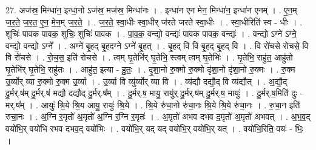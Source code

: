 \documentclass[17pt]{extarticle}
\begin{document}
27. अज॑स्र॒ मिन्धा॑न॒ इन्धा॒नो ऽज॑स्र॒ मज॑स्र॒ मिन्धा॑नः । . इन्धा॑न एन मेन॒ मिन्धा॑न॒ इन्धा॑न एनम् । . ए॒न॒म् ज॒र॒ते॒ ज॒र॒त॒ ए॒न॒ मे॒न॒म् ज॒र॒ते॒ । . ज॒र॒ते॒ स्वा॒धीः स्वा॒धीर् ज॑रते जरते स्वा॒धीः । . स्वा॒धीरिति॑ स्व - धीः । . शुचिः॑ पावक पावक॒ शुचिः॒ शुचिः॑ पावक । . पा॒व॒क॒ वन्द्यो॒ वन्द्यः॑ पावक पावक॒ वन्द्यः॑ । . वन्द्यो ऽग्ने ऽग्ने॒ वन्द्यो॒ वन्द्यो ऽग्ने᳚ । . अग्ने॑ बृ॒हद् बृ॒हदग्ने ऽग्ने॑ बृ॒हत् । . बृ॒हद् वि वि बृ॒हद् बृ॒हद् वि । . वि रो॑चसे रोचसे॒ वि वि रो॑चसे । . रो॒च॒स॒ इति॑ रोचसे । . त्वम् घृ॒तेभि॑र् घृ॒तेभि॒ स्त्वम् त्वम् घृ॒तेभिः॑ । . घृ॒तेभि॒ राहु॑त॒ आहु॑तो घृ॒तेभि॑र् घृ॒तेभि॒ राहु॑तः । . आहु॑त॒ इत्या - हु॒तः॒ । . दृ॒शा॒नो रु॒क्मो रु॒क्मो दृ॑शा॒नो दृ॑शा॒नो रु॒क्मः । . रु॒क्म उ॒र्व्योर् व्या रु॒क्मो रु॒क्म उ॒र्व्या । . उ॒र्व्या वि व्यु॑र्व्योर् व्या वि । . व्य॑द्यौ दद्यौ॒द् वि व्य॑द्यौत् । . अ॒द्यौ॒द् दु॒र्मर्.ष॑म् दु॒र्मर्.ष॑ मद्यौ दद्यौद् दु॒र्मर्.ष᳚म् । . दु॒र्मर्.ष॒ मायु॒ रायु॑र् दु॒र्मर्.ष॑म् दु॒र्मर्.ष॒ मायुः॑ । . दु॒र्मर्.ष॒मिति॑ दुः - मर्.ष᳚म् । . आयुः॑ श्रि॒ये श्रि॒य आयु॒ रायुः॑ श्रि॒ये । . श्रि॒ये रु॑चा॒नो रु॑चा॒नः श्रि॒ये श्रि॒ये रु॑चा॒नः । . रु॒चा॒न इति॑ रुचा॒नः । . अ॒ग्नि र॒मृतो॑ अ॒मृतो॑ अ॒ग्नि र॒ग्नि र॒मृतः॑ । . अ॒मृतो॑ अभव दभव द॒मृतो॑ अ॒मृतो॑ अभवत् । . अ॒भ॒व॒द् वयो॑भि॒र् वयो॑भि रभव दभव॒द् वयो॑भिः । . वयो॑भि॒र् यद् यद् वयो॑भि॒र् वयो॑भि॒र् यत् । . वयो॑भि॒रिति॒ वयः॑ - भिः॒ । \newline
\end{document}
